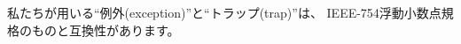 \begin{commentary}
私たちが用いる``例外(exception)''と``トラップ(trap)''は、
IEEE-754浮動小数点規格のものと互換性があります。
\end{commentary}

\begin{comment}
How traps are handled and made visible to software running on the hart
depends on the enclosing execution environment.  From the perspective
of software running inside an execution environment, traps encountered
by a hart at runtime can have four different effects:
\begin{description}
  \item[Contained Trap:] The trap is visible to, and handled by,
    software running inside the execution environment.  For example,
    in an EEI providing both supervisor and user
    mode on harts, an ECALL by a user-mode hart will generally result
    in a transfer of control to a supervisor-mode handler running on
    the same hart.  Similarly, in the same environment, when a hart is
    interrupted, an interrupt handler will be run in supervisor mode
    on the hart.
  \item[Requested Trap:] The trap is a synchronous exception that is
    an explicit call to the execution environment requesting an action
    on behalf of software inside the execution environment.  An
    example is a system call.  In this case, execution may or may not
    resume on the hart after the requested action is taken by the
    execution environment.  For example, a system call could remove the
    hart or cause an orderly termination of the entire execution environment.
  \item[Invisible Trap:] The trap is handled transparently by the
    execution environment and execution resumes normally after the
    trap is handled.  Examples include emulating missing instructions,
    handling non-resident page faults in a demand-paged virtual-memory
    system, or handling device interrupts for a different job in a
    multiprogrammed machine.  In these cases, the software running
    inside the execution environment is not aware of the trap (we
    ignore timing effects in these definitions).
  \item[Fatal Trap:] The trap represents a fatal failure and causes
    the execution environment to terminate execution.  Examples
    include failing a virtual-memory page-protection check or allowing
    a watchdog timer to expire.  Each EEI should define how execution
    is terminated and reported to an external environment.
\end{description}
\end{comment}


